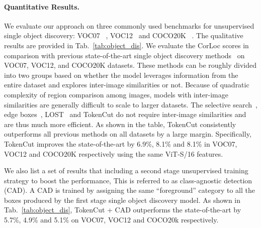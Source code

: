 \documentclass[twocolumn]{article}
\begin{document}
\paragraph{Quantitative Results.}
We evaluate our approach on three commonly used benchmarks for unsupervised single object discovery: VOC07~\cite{pascal-voc-2007} , VOC12~\cite{pascal-voc-2012} and COCO20K ~\cite{lin2014microsoft,vo2020toward}. The qualitative results are provided in Tab.~\ref{tab:object_dis}. We evaluate the CorLoc scores in comparison with previous state-of-the-art single object discovery methods~\cite{uijlings2013selective, zitnick2014edge, simeoni2021localizing, kim2009unsupervised, zhang2020object, wei2019unsupervised, vo2020toward, vo2021large} on VOC07, VOC12, and COCO20K datasets. These methods can be roughly divided into two groups based on whether the model leverages information from the entire dataset and explores inter-image similarities or not. Because of quadratic complexity of region comparison among images, models with inter-image similarities are generally difficult to scale to larger datasets. The selective search~\cite{uijlings2013selective}, edge boxes~\cite{zitnick2014edge}, LOST~\cite{simeoni2021localizing} and  TokenCut do not require inter-image similarities and are thus much more efficient. As shown in the table,  TokenCut consistently outperforms all previous methods on all datasets by a large margin. Specifically, TokenCut improves the state-of-the-art by 6.9\%, 8.1\% and 8.1\% in VOC07, VOC12 and COCO20K respectively using the same ViT-S/16 features.

We also list a set of results that including a second stage unsupervised training strategy to boost the performance, This is referred to as class-agnostic detection (CAD). A CAD is trained by assigning the same ``foreground'' category to all the boxes produced by the first stage single object discovery model. As shown in Tab.~\ref{tab:object_dis}, TokenCut + CAD outperforms the state-of-the-art by 5.7\%, 4.9\% and 5.1\% on VOC07, VOC12 and COCO20k respectively. 
\end{document}
